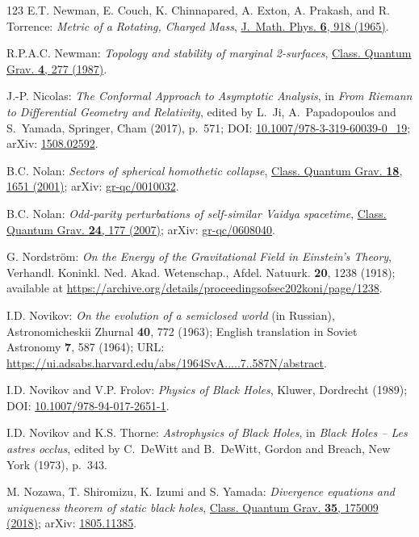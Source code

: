 \begin{thebibliography}{123}
E.T. Newman, E. Couch, K. Chinnapared, A. Exton, A. Prakash, and R. Torrence:
{\em Metric of a Rotating, Charged Mass},
\href{https://doi.org/10.1063/1.1704351}{J.~Math. Phys. {\bf 6}, 918 (1965)}.

R.P.A.C. Newman:
{\em Topology and stability of marginal 2-surfaces},
\href{https://doi.org/10.1088/0264-9381/4/2/011}{Class. Quantum Grav. {\bf 4}, 277 (1987)}.

J.-P. Nicolas:
{\em The Conformal Approach to Asymptotic Analysis},
in {\em From Riemann to Differential Geometry and Relativity},
edited by L.~Ji, A.~Papadopoulos and S.~Yamada, Springer, Cham (2017), p.~571;
DOI: \href{https://doi.org/10.1007/978-3-319-60039-0_19}{10.1007/978-3-319-60039-0\_19};
arXiv: \href{https://arxiv.org/abs/1508.02592}{1508.02592}.

B.C. Nolan:
{\em Sectors of spherical homothetic collapse},
\href{https://doi.org/10.1088/0264-9381/18/9/304}{Class. Quantum Grav. {\bf 18}, 1651 (2001)};
arXiv: \href{https://arxiv.org/abs/gr-qc/0010032}{gr-qc/0010032}.

B.C. Nolan:
{\em Odd-parity perturbations of self-similar Vaidya spacetime},
\href{https://doi.org/10.1088/0264-9381/24/1/010}{Class. Quantum Grav. {\bf 24}, 177 (2007)};
arXiv: \href{https://arxiv.org/abs/gr-qc/0608040}{gr-qc/0608040}.

G. Nordström:
{\em On the Energy of the Gravitational Field in Einstein's Theory},
Verhandl. Koninkl. Ned. Akad. Wetenschap., Afdel. Natuurk. {\bf 20}, 1238 (1918);
available at
\url{https://archive.org/details/proceedingsofsec202koni/page/1238}.

I.D. Novikov:
{\em On the evolution of a semiclosed world} (in Russian),
Astronomicheskii Zhurnal {\bf 40}, 772 (1963); English translation in
Soviet Astronomy {\bf 7}, 587 (1964);
URL: \url{https://ui.adsabs.harvard.edu/abs/1964SvA.....7..587N/abstract}.

I.D. Novikov and V.P. Frolov: {\em Physics of Black Holes},
Kluwer, Dordrecht (1989);
DOI: \href{https://doi.org/10.1007/978-94-017-2651-1}{10.1007/978-94-017-2651-1}.

I.D. Novikov and K.S. Thorne: {\em Astrophysics of Black Holes},
in {\em Black Holes -- Les astres occlus},  edited by C.~DeWitt and B.~DeWitt,
Gordon and Breach, New York (1973), p.~343.

M. Nozawa, T. Shiromizu, K. Izumi and S. Yamada:
{\em Divergence equations and uniqueness theorem of static black holes},
\href{https://doi.org/10.1088/1361-6382/aad206}{Class. Quantum Grav. {\bf 35}, 175009 (2018)};
arXiv: \href{https://arxiv.org/abs/1805.11385}{1805.11385}.


\end{thebibliography}
